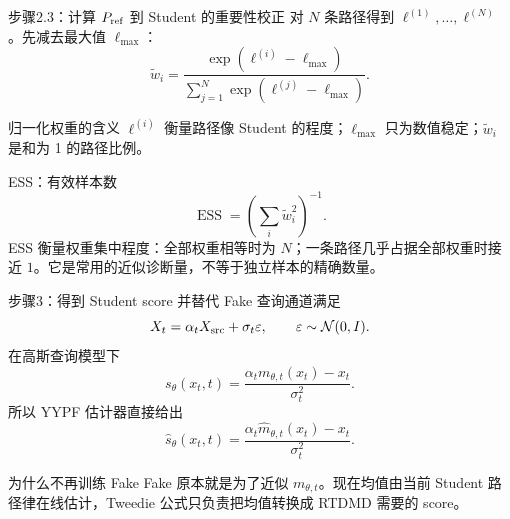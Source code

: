 \documentclass[10pt,aspectratio=169]{beamer}
\newcommand{\N}{\mathcal N}
\newcommand{\ESS}{\operatorname{ESS}}
\begin{document}
\begin{frame}{步骤2.3：计算 \ensuremath{P_{\rm ref}} 到 Student 的重要性校正}
对 $N$ 条路径得到 $\ell^{(1)},\ldots,\ell^{(N)}$。先减去最大值 $\ell_{\max}$：
\begin{equation}
\widetilde w_i
=\frac{\exp(\ell^{(i)}-\ell_{\max})}
{\sum_{j=1}^N\exp(\ell^{(j)}-\ell_{\max})}.
\end{equation}
\begin{block}{归一化权重的含义}
\small
$\ell^{(i)}$ 衡量路径像 Student 的程度；$\ell_{\max}$ 只为数值稳定；$\widetilde w_i$ 是和为 1 的路径比例。
\end{block}
\begin{alertblock}{ESS：有效样本数}
\begin{equation}
\ESS=\left(\sum_i\widetilde w_i^2\right)^{-1}.
\end{equation}
ESS 衡量权重集中程度：全部权重相等时为 $N$；一条路径几乎占据全部权重时接近 $1$。它是常用的近似诊断量，不等于独立样本的精确数量。
\end{alertblock}
\end{frame}

\begin{frame}{步骤3：得到 Student score 并替代 Fake}
查询通道满足
\begin{equation}
X_t=\alpha_tX_{\rm src}+\sigma_t\varepsilon,
\qquad \varepsilon\sim\N(0,I).
\end{equation}
在高斯查询模型下
\begin{equation}
s_\theta(x_t,t)=
\frac{\alpha_t m_{\theta,t}(x_t)-x_t}{\sigma_t^2}.
\end{equation}
所以 YYPF 估计器直接给出
\begin{equation}
\boxed{\widehat s_\theta(x_t,t)=
\frac{\alpha_t\widehat m_{\theta,t}(x_t)-x_t}{\sigma_t^2}}.
\end{equation}
\begin{block}{为什么不再训练 Fake}
Fake 原本就是为了近似 $m_{\theta,t}$。现在均值由当前 Student 路径律在线估计，Tweedie 公式只负责把均值转换成 RTDMD 需要的 score。
\end{block}
\end{frame}
\end{document}
